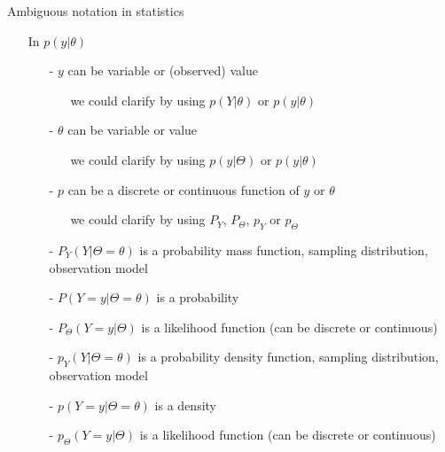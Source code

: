 \documentclass[10pt]{beamer}
\begin{document}
\begin{frame}{Ambiguous notation in statistics}

  \begin{itemize}
  \item[] In $p(y|\theta)$
    \pause
  \begin{itemize}
  \item[-] $y$ can be variable or (observed) value
    \begin{itemize}
    \item[] we could clarify by using $p(Y|\theta)$ or $p(y|\theta)$
    \end{itemize}
    \pause
  \item[-] $\theta$ can be variable or value
    \begin{itemize}
    \item[] we could clarify by using $p(y|\Theta)$ or $p(y|\theta)$
    \end{itemize}
    \pause
  \item[-] $p$ can be a discrete or continuous function of $y$ or $\theta$
    \begin{itemize}
    \item[] we could clarify by using $P_Y$, $P_\Theta$, $p_Y$ or $p_\Theta$
    \end{itemize}
    \pause
\item[-]
  $P_Y(Y|\Theta=\theta)$ is a probability mass function, sampling distribution, observation model
    \pause
\item[-]
$P(Y=y|\Theta=\theta)$ is a probability
    \pause
\item[-]
$P_\Theta(Y=y|\Theta)$ is a likelihood function (can be discrete or continuous)
    \pause
\item[-] $p_Y(Y|\Theta=\theta)$ is a probability density function, sampling distribution, observation model
    \pause
\item[-] $p(Y=y|\Theta=\theta)$ is a density
    \pause
\item[-] $p_\Theta(Y=y|\Theta)$ is a likelihood function (can be discrete or continuous)

  \end{itemize}
\end{itemize}
\end{frame}
\end{document}
